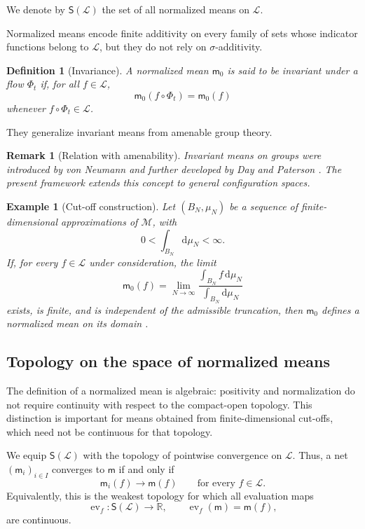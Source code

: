 \documentclass[10pt,a4paper]{amsart}
\newtheorem{Definition}[Theorem]{Definition}
\newtheorem{rem}[Theorem]{Remark}
\newtheorem{example}[Theorem]{Example}
\begin{document}
We denote by $\mathsf S(\mathcal L)$ the set of all normalized means on
$\mathcal L$.

Normalized means encode finite additivity on every family of sets whose
indicator functions belong to $\mathcal L$, but they do not rely on
$\sigma$-additivity.

\begin{Definition}[Invariance]
A normalized mean $\mathsf m_0$ is said to be invariant under a flow
$\Phi_t$ if, for all $f\in\mathcal L$,
\[
\mathsf m_0(f\circ\Phi_t)=\mathsf m_0(f)
\]
whenever $f\circ\Phi_t\in\mathcal L$.
\end{Definition}

They generalize invariant means from amenable group theory.

\begin{rem}[Relation with amenability]
Invariant means on groups were introduced by von Neumann and further
developed by Day and Paterson
\cite{vonNeumann29,Day57,Paterson88}. The present framework extends this
concept to general configuration spaces.
\end{rem}

\begin{example}[Cut-off construction]
\label{ex:cutoff-mean}
Let $(B_N,\mu_N)$ be a sequence of finite-dimensional approximations of
$\mathcal M$, with
\[
0<\int_{B_N}\mathrm d\mu_N<\infty.
\]
If, for every $f\in\mathcal L$ under consideration, the limit
\[
\mathsf m_0(f)
=
\lim_{N\to\infty}
\frac{\displaystyle\int_{B_N}f\,\mathrm d\mu_N}
{\displaystyle\int_{B_N}\mathrm d\mu_N}
\]
exists, is finite, and is independent of the admissible truncation, then
$\mathsf m_0$ defines a normalized mean on its domain
\cite{Magnot17}.
\end{example}

\subsection{Topology on the space of normalized means}
\label{subsec:topology-means}

The definition of a normalized mean is algebraic: positivity and
normalization do not require continuity with respect to the compact-open
topology. This distinction is important for means obtained from
finite-dimensional cut-offs, which need not be continuous for that
topology.

We equip $\mathsf S(\mathcal L)$ with the topology of pointwise
convergence on $\mathcal L$. Thus, a net
$(\mathsf m_i)_{i\in I}$ converges to $\mathsf m$ if and only if
\[
\mathsf m_i(f)\longrightarrow\mathsf m(f)
\qquad
\text{for every }f\in\mathcal L.
\]
Equivalently, this is the weakest topology for which all evaluation maps
\[
\operatorname{ev}_f\colon
\mathsf S(\mathcal L)\longrightarrow\mathbb R,
\qquad
\operatorname{ev}_f(\mathsf m)=\mathsf m(f),
\]
are continuous.
\end{document}
